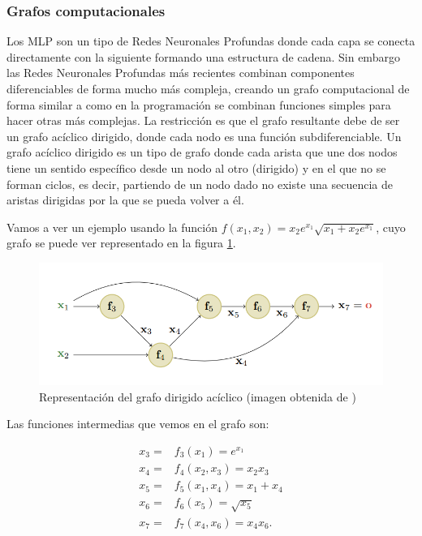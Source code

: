 \subsubsection{Grafos computacionales}

Los MLP son un tipo de Redes Neuronales Profundas donde cada capa se conecta directamente con la siguiente formando una estructura de cadena. Sin embargo las Redes Neuronales Profundas más recientes combinan componentes diferenciables de forma mucho más compleja, creando un grafo computacional de forma similar a como en la programación se combinan funciones simples para hacer otras más complejas. La restricción es que el grafo resultante debe de ser un grafo acíclico dirigido, donde cada nodo es una función subdiferenciable. Un grafo acíclico dirigido es un tipo de grafo donde cada arista que une dos nodos tiene un sentido específico desde un nodo al otro (dirigido) y en el que no se forman ciclos, es decir, partiendo de un nodo dado no existe una secuencia de aristas dirigidas por la que se pueda volver a él.



Vamos a ver un ejemplo usando la función $f(x_1,x_2)=x_2e^{x_1}\sqrt{x_1+x_2e^{x_1}}$, cuyo grafo se puede ver representado en la figura \ref{fig:def.grafo}.


\begin{figure}
    \centering
    \includegraphics[width=1.0\linewidth]{Plantilla_TFG_latex/imagenes/Mat/Definicion/graf.png}
    \caption{Representación del grafo dirigido acíclico (imagen obtenida de \cite{murphy2022probabilistic})}
    \label{fig:def.grafo}
\end{figure}


Las funciones intermedias que vemos en el grafo son:

\begin{align*}
x_3= &f_3(x_1)=e^{x_1} \\
x_4 = &f_4(x_2,x_3)=x_2x_3 \\
x_5=&f_5(x_1,x_4)=x_1 + x_4 \\
x_6=&f_6(x_5) = \sqrt{x_5} \\
x_7=&f_7(x_4,x_6)=x_4x_6 .
\end{align*}

